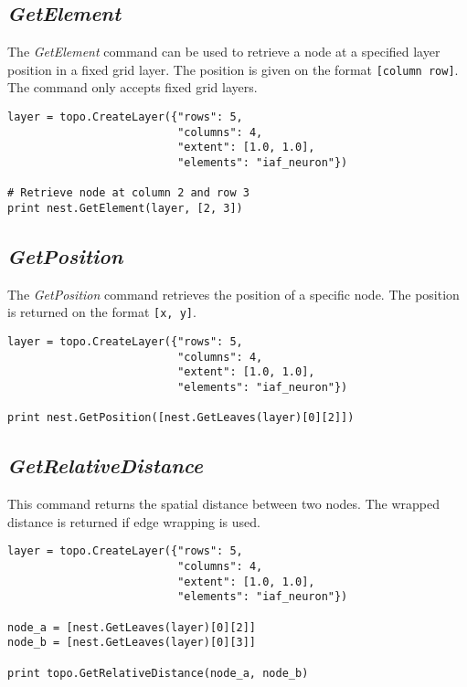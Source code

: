 \documentclass{article}
\begin{document}
\subsection{\emph{GetElement}}

The \emph{GetElement} command can be used to retrieve a node at a specified layer position in a fixed grid layer. The position is given on the format \verb|[column row]|. The command only accepts fixed grid layers.

\begin{verbatim}
layer = topo.CreateLayer({"rows": 5,
                          "columns": 4,
                          "extent": [1.0, 1.0],
                          "elements": "iaf_neuron"})

# Retrieve node at column 2 and row 3
print nest.GetElement(layer, [2, 3])
\end{verbatim}

\subsection{\emph{GetPosition}}

The \emph{GetPosition} command retrieves the position of a specific node. The position is returned on the format \verb|[x, y]|.

\begin{verbatim}
layer = topo.CreateLayer({"rows": 5,
                          "columns": 4,
                          "extent": [1.0, 1.0],
                          "elements": "iaf_neuron"})

print nest.GetPosition([nest.GetLeaves(layer)[0][2]])
\end{verbatim}

\subsection{\emph{GetRelativeDistance}}

This command returns the spatial distance between two nodes. The wrapped distance is returned if edge wrapping is used.

\begin{verbatim}
layer = topo.CreateLayer({"rows": 5,
                          "columns": 4,
                          "extent": [1.0, 1.0],
                          "elements": "iaf_neuron"})

node_a = [nest.GetLeaves(layer)[0][2]]
node_b = [nest.GetLeaves(layer)[0][3]]

print topo.GetRelativeDistance(node_a, node_b)
\end{verbatim}
\end{document}
